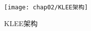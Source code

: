 \begin{figure}[h]
\begin{center}
\texttt{[image: chap02/KLEE架构]}
\end{center}
\caption{KLEE架构}
\label{KLEE架构}
\end{figure}


%
%
%
%
%
%
%
%
%
%
%
%
%
